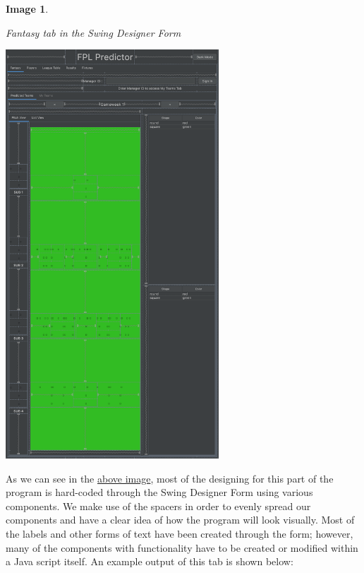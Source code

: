 \documentclass[12pt, a4paper, oneside]{book}
\newtheorem{image}[theorem]{Image}
\numberwithin{equation}{section}
\begin{document}
\begin{image} \label{Fantasy tab in the Swing Designer Form}

  Fantasy tab in the Swing Designer Form

  \vspace{0.5cm}

  \centerline{\includegraphics[width=0.6\textwidth]{images/gui/fantasy-tab/fantasy-tab-swing-designer}}

\end{image}

As we can see in the \hyperref[Fantasy tab in the Swing Designer Form]{above image}, most of the designing for this part of the program is hard-coded through the Swing Designer Form using various components. We make use of the spacers in order to evenly spread our components and have a clear idea of how the program will look visually. Most of the labels and other forms of text have been created through the form; however, many of the components with functionality have to be created or modified within a Java script itself. An example output of this tab is shown below:
\end{document}
